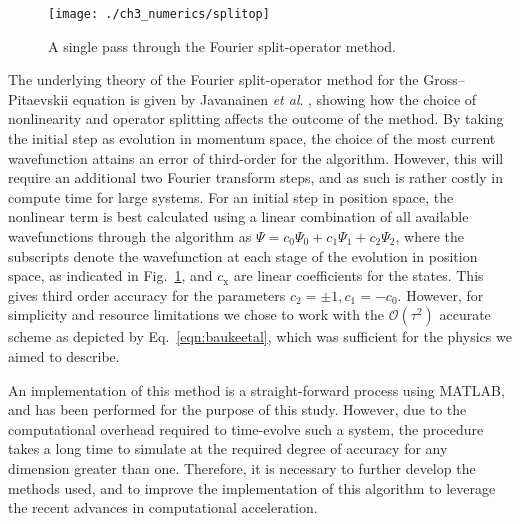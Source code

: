 \begin{figure}
    \centering
    \texttt{[image: ./ch3\_numerics/splitop]}
    \caption{A single pass through the Fourier split-operator method.}
    \label{fig:num_splitop}
\end{figure}

The underlying theory of the Fourier split-operator method for the Gross--Pitaevskii equation is given by Javanainen \textit{et al}. \cite{BEC:Javanainen_jphysa_2006}, showing how the choice of nonlinearity and operator splitting affects the outcome of the method. By taking the initial step as evolution in momentum space, the choice of the most current wavefunction attains an error of third-order for the algorithm. However, this will require an additional two Fourier transform steps, and as such is rather costly in compute time for large systems. For an initial step in position space, the nonlinear term is best calculated using a linear combination of all available wavefunctions through the algorithm as $\Psi = c_0\Psi_0 + c_1\Psi_1 + c_2\Psi_2$, where the subscripts denote the wavefunction at each stage of the evolution in position space, as indicated in Fig.~\ref{fig:num_splitop}, and $c_{\textrm{x}}$ are linear coefficients for the states. This gives third order accuracy for the parameters $c_2=\pm 1, c_1=-c_0$. However, for simplicity and resource limitations we chose to work with the $\mathcal{O}\left(\tau^2\right)$ accurate scheme as depicted by Eq.~\eqref{eqn:baukeetal}, which was sufficient for the physics we aimed to describe.

An implementation of this method is a straight-forward process using MATLAB, and has been performed for the purpose of this study. However, due to the computational overhead required to time-evolve such a system, the procedure takes a long time to simulate at the required degree of accuracy for any dimension greater than one. Therefore, it is necessary to further develop the methods used, and to improve the implementation of this algorithm to leverage the recent advances in computational acceleration.

